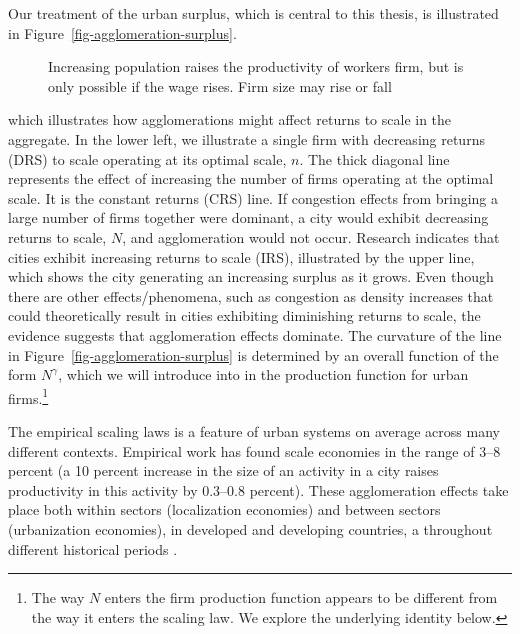 Our treatment of the urban surplus, which is central to this thesis, is illustrated in Figure~\ref{fig-agglomeration-surplus}. 
\begin{figure}[htb]
    \centering

    \caption{Increasing population raises the productivity of workers firm, but is only possible if the wage rises. Firm size may rise or fall}
    \label{fig-wage-workforce-effects} %
\end{figure}
which illustrates how agglomerations might affect returns to scale in the aggregate.
In the lower left, we illustrate a single firm with decreasing returns (DRS) to scale operating at its optimal scale, $n$. The thick diagonal line represents the effect of increasing the number of firms operating at the optimal scale. It is the constant returns (CRS) line. If congestion effects from bringing a large number of firms together were dominant, a city would exhibit decreasing returns to scale,  $N$, and agglomeration would not occur. Research indicates that cities exhibit increasing returns to scale (IRS), illustrated by the upper line, which shows the city generating an increasing surplus as it grows. Even though there are other effects/phenomena, such as congestion as density increases that could theoretically result in cities exhibiting diminishing returns to scale, the evidence suggests that agglomeration effects dominate. The curvature of the line in Figure~\ref{fig-agglomeration-surplus} is determined by an overall  function of the form $N^\gamma$, which we will introduce into in the production function for urban firms.\footnote{The way $N$ enters the firm production function appears to be different from the way it enters the scaling law. We explore the underlying identity below.} 

The empirical \glspl{scaling law} is a feature of urban systems on average across many different contexts.  Empirical work has found %
scale economies in the range of 3--8 percent (a 10 percent increase in the size of an activity in a city raises productivity in this activity by 0.3--0.8 percent). These agglomeration effects take place both within sectors (localization economies) and between sectors (urbanization economies),  in developed and developing countries, a throughout different historical periods \cite{bettencourtIntroductionUrbanScience2021}. %

